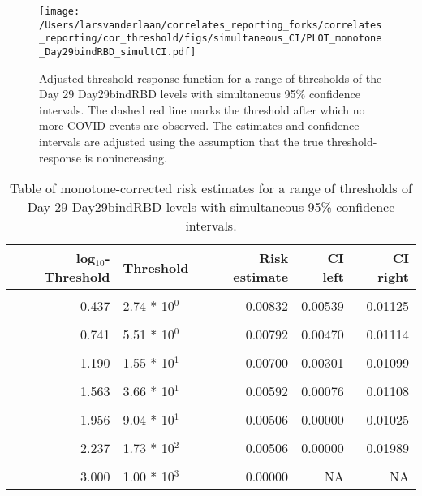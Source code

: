 \documentclass[]{article}
\begin{document}
\begin{figure}[H]
\centering
\texttt{[image: /Users/larsvanderlaan/correlates\_reporting\_forks/correlates\_reporting/cor\_threshold/figs/simultaneous\_CI/PLOT\_monotone\_Day29bindRBD\_simultCI.pdf]}
\caption{Adjusted threshold-response function for a range of thresholds of the
  Day 29 Day29bindRBD levels with simultaneous 95\% confidence intervals. The dashed red line marks the threshold after which no more COVID events are observed. The estimates and confidence intervals are adjusted using the assumption that the true threshold-response is nonincreasing.}
\end{figure}
\begin{table}[!h]

\caption{\label{tab:unnamed-chunk-56}Table of monotone-corrected risk estimates for a range of thresholds of Day 29 Day29bindRBD levels with simultaneous 95\% confidence intervals.}
\centering
\begin{tabular}[t]{rlrrr}
\toprule
log$_{10}$-Threshold & Threshold & Risk estimate & CI left & CI right\\
\midrule
\cellcolor{gray!6}{-0.099} & \cellcolor{gray!6}{7.96 * 10$^{1}$} & \cellcolor{gray!6}{0.00856} & \cellcolor{gray!6}{0.00577} & \cellcolor{gray!6}{0.01134}\\
0.437 & 2.74 * 10$^{0}$ & 0.00832 & 0.00539 & 0.01125\\
\cellcolor{gray!6}{0.585} & \cellcolor{gray!6}{3.85 * 10$^{0}$} & \cellcolor{gray!6}{0.00832} & \cellcolor{gray!6}{0.00520} & \cellcolor{gray!6}{0.01144}\\
0.741 & 5.51 * 10$^{0}$ & 0.00792 & 0.00470 & 0.01114\\
\cellcolor{gray!6}{1.000} & \cellcolor{gray!6}{1.00 * 10$^{1}$} & \cellcolor{gray!6}{0.00756} & \cellcolor{gray!6}{0.00422} & \cellcolor{gray!6}{0.01091}\\
1.190 & 1.55 * 10$^{1}$ & 0.00700 & 0.00301 & 0.01099\\
\cellcolor{gray!6}{1.371} & \cellcolor{gray!6}{2.35 * 10$^{1}$} & \cellcolor{gray!6}{0.00636} & \cellcolor{gray!6}{0.00191} & \cellcolor{gray!6}{0.01080}\\
1.563 & 3.66 * 10$^{1}$ & 0.00592 & 0.00076 & 0.01108\\
\cellcolor{gray!6}{1.852} & \cellcolor{gray!6}{7.11 * 10$^{1}$} & \cellcolor{gray!6}{0.00587} & \cellcolor{gray!6}{0.00000} & \cellcolor{gray!6}{0.01182}\\
1.956 & 9.04 * 10$^{1}$ & 0.00506 & 0.00000 & 0.01025\\
\cellcolor{gray!6}{2.083} & \cellcolor{gray!6}{1.21 * 10$^{2}$} & \cellcolor{gray!6}{0.00506} & \cellcolor{gray!6}{0.00000} & \cellcolor{gray!6}{0.01989}\\
2.237 & 1.73 * 10$^{2}$ & 0.00506 & 0.00000 & 0.01989\\
\cellcolor{gray!6}{2.699} & \cellcolor{gray!6}{5.00 * 10$^{2}$} & \cellcolor{gray!6}{0.00000} & \cellcolor{gray!6}{NA} & \cellcolor{gray!6}{NA}\\
3.000 & 1.00 * 10$^{3}$ & 0.00000 & NA & NA\\
\bottomrule
\end{tabular}
\end{table}
\end{document}
